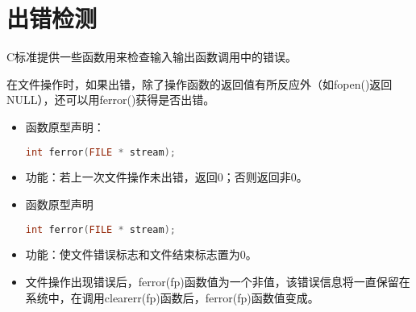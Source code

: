 \section{出错检测}
\begin{frame}[fragile]\ft{\secname}
C标准提供一些函数用来检查输入输出函数调用中的错误。
\end{frame}

\begin{frame}[fragile]
  在文件操作时，如果出错，除了操作函数的返回值有所反应外（如{\tf fopen()}返回{\tf NULL}），还可以用{\tf ferror()}获得是否出错。
\begin{itemize}
\item 
函数原型声明：
\begin{lstlisting}[language=c,backgroundcolor=\color{red!20}]
int ferror(FILE * stream);
\end{lstlisting}
\item
功能：若上一次文件操作未出错，返回0；否则返回非0。
\end{itemize}
\end{frame}

\begin{frame}[fragile]
  \begin{itemize}
  \item 函数原型声明
    \begin{lstlisting}[language=c,backgroundcolor=\color{red!20}]
int ferror(FILE * stream);
    \end{lstlisting}
  \item 
    功能：使文件错误标志和文件结束标志置为0。 \\[0.1in]
\item
  文件操作出现错误后，{\tf ferror(fp)}函数值为一个非{}值，该错误信息将一直保留在系统中，在调用{\tf clearerr(fp)}函数后，{\tf ferror(fp)}函数值变成{}。
\end{itemize}

\end{frame}


